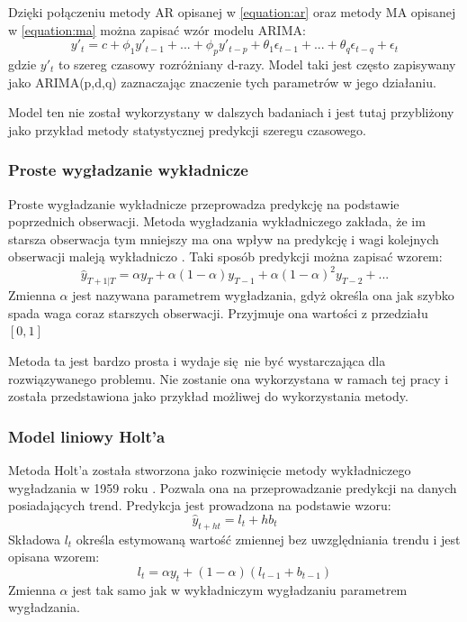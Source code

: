\documentclass[10pt,a4paper]{article}
\begin{document}
Dzięki połączeniu metody AR opisanej w \autoref{equation:ar} oraz metody MA opisanej w \autoref{equation:ma} można zapisać wzór modelu ARIMA:
\begin{equation}
	y'_t = c 
	+ \phi_1 y'_{t-1} + ... + \phi_p y'_{t-p}  
	+ \theta_1\epsilon_{t-1} +  ... + \theta_q\epsilon_{t-q} 
	+ \epsilon_t
\end{equation}
gdzie $y'_t$ to szereg czasowy rozróżniany d-razy. Model taki jest często zapisywany jako ARIMA(p,d,q) zaznaczając znaczenie tych parametrów w jego działaniu. 

Model ten nie został wykorzystany w dalszych badaniach i jest tutaj przybliżony jako przykład metody statystycznej predykcji szeregu czasowego. 

\subsubsection{Proste wygładzanie wykładnicze}
Proste wygładzanie wykładnicze przeprowadza predykcję na podstawie poprzednich obserwacji. Metoda wygładzania wykładniczego zakłada, że im starsza obserwacja tym mniejszy ma ona wpływ na predykcję i wagi kolejnych obserwacji maleją wykładniczo \cite{ses}. Taki sposób predykcji można zapisać wzorem: 
\begin{equation}
	\hat{y}_{T+1|T} = \alpha y_T + \alpha(1-\alpha)y_{T-1} + \alpha(1-\alpha)^2y_{T-2} + ...
\end{equation}  
Zmienna $\alpha$ jest nazywana parametrem wygładzania, gdyż określa ona jak szybko spada waga coraz starszych obserwacji. Przyjmuje ona wartości z przedziału $[0,1]$

Metoda ta jest bardzo prosta i wydaje się nie być wystarczająca dla rozwiązywanego problemu. Nie zostanie ona wykorzystana w ramach tej pracy i została przedstawiona jako przykład możliwej do wykorzystania metody. 

\subsubsection{Model liniowy Holt'a}
Metoda Holt'a została stworzona jako rozwinięcie metody wykładniczego wygładzania w 1959 roku \cite{holt2004forecasting}. Pozwala ona na przeprowadzanie predykcji na danych posiadających trend. Predykcja jest prowadzona na podstawie wzoru: 
\begin{equation}
	\hat{y}_{t+ht} = l_t + hb_t
\end{equation}
Składowa $l_t$ określa estymowaną wartość zmiennej bez uwzględniania trendu i jest opisana wzorem:
\begin{equation}
	l_t = \alpha y_t + (1-\alpha)(l_{t - 1} + b_{t-1})
\end{equation}
Zmienna $\alpha$ jest tak samo jak w wykładniczym wygładzaniu parametrem wygładzania. 
\end{document}
